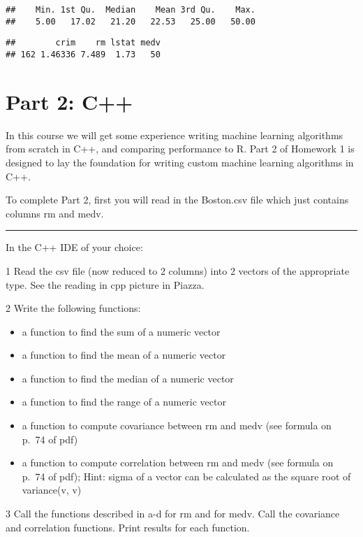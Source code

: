 \documentclass[
]{article}
\newenvironment{Shaded}{\begin{snugshade}}{\end{snugshade}}
\newcommand{\FunctionTok}[1]{\textcolor[rgb]{0.00,0.00,0.00}{#1}}
\newcommand{\NormalTok}[1]{#1}
\newcommand{\OtherTok}[1]{\textcolor[rgb]{0.56,0.35,0.01}{#1}}
\newcommand{\SpecialCharTok}[1]{\textcolor[rgb]{0.00,0.00,0.00}{#1}}
\newcommand{\StringTok}[1]{\textcolor[rgb]{0.31,0.60,0.02}{#1}}
\begin{document}
\begin{verbatim}
##    Min. 1st Qu.  Median    Mean 3rd Qu.    Max. 
##    5.00   17.02   21.20   22.53   25.00   50.00
\end{verbatim}

\begin{Shaded}
\end{Shaded}

\begin{verbatim}
##        crim    rm lstat medv
## 162 1.46336 7.489  1.73   50
\end{verbatim}

\hypertarget{part-2-c}{%
\section{Part 2: C++}\label{part-2-c}}

In this course we will get some experience writing machine learning
algorithms from scratch in C++, and comparing performance to R. Part 2
of Homework 1 is designed to lay the foundation for writing custom
machine learning algorithms in C++.

To complete Part 2, first you will read in the Boston.csv file which
just contains columns rm and medv.

\begin{center}\rule{0.5\linewidth}{0.5pt}\end{center}

In the C++ IDE of your choice:

1 Read the csv file (now reduced to 2 columns) into 2 vectors of the
appropriate type. See the reading in cpp picture in Piazza.

2 Write the following functions:

\begin{itemize}
\item
  a function to find the sum of a numeric vector
\item
  a function to find the mean of a numeric vector
\item
  a function to find the median of a numeric vector
\item
  a function to find the range of a numeric vector
\item
  a function to compute covariance between rm and medv (see formula on
  p.~74 of pdf)
\item
  a function to compute correlation between rm and medv (see formula on
  p.~74 of pdf); Hint: sigma of a vector can be calculated as the square
  root of variance(v, v)
\end{itemize}

3 Call the functions described in a-d for rm and for medv. Call the
covariance and correlation functions. Print results for each function.
\end{document}
